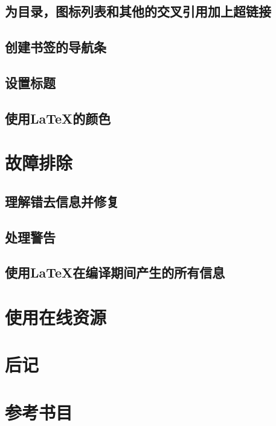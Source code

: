 \documentclass{book}
\begin{document}
	\section{为目录，图标列表和其他的交叉引用加上超链接}
	\section{创建书签的导航条}
	\section{设置标题}
	\section{使用LaTeX的颜色}
\chapter{故障排除}
	\section{理解错去信息并修复}
	\section{处理警告}
	\section{使用LaTeX在编译期间产生的所有信息}
\chapter{使用在线资源}
\appendix
	
	
\chapter{后记}
\chapter{参考书目}
\end{document}
